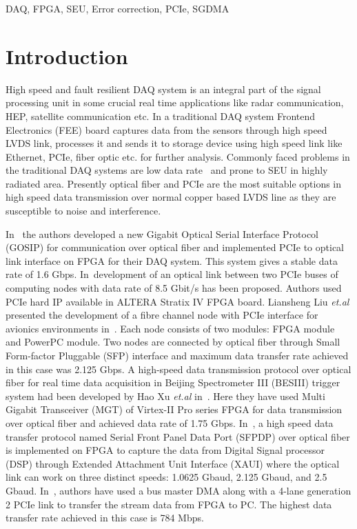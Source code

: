 \documentclass[10pt, conference, compsocconf]{IEEEtran}
\begin{document}
\begin{IEEEkeywords} 
DAQ, FPGA, SEU, Error correction, PCIe, SGDMA
\end{IEEEkeywords}
\section{Introduction}
\label{Introduction}
 High speed and fault resilient DAQ system is an integral part of the signal processing unit in some crucial real time applications like radar communication, HEP, satellite communication etc. In a traditional DAQ system Frontend Electronics (FEE) board captures data from the sensors through high speed LVDS link, processes it and sends it to storage device using high speed link like Ethernet, PCIe, fiber optic etc. for further analysis. Commonly faced problems in the traditional DAQ systems are low data rate~\cite{Wang:iciea:2009} and prone to SEU in highly radiated area. Presently optical fiber and PCIe are the most suitable options in high speed data transmission over normal copper based LVDS line as they are susceptible to noise and interference.
 \par 
 In~\cite{Minami:ieeetran:2011} the authors developed a new Gigabit Optical Serial Interface Protocol (GOSIP) for communication over optical fiber  and implemented PCIe to optical link interface on FPGA for their DAQ system. This system gives a stable data rate of 1.6 Gbps. In~\cite{kadric:socc:2012}\iffalse, we find the \fi  development of an optical link between two PCIe buses of computing nodes with data rate of 8.5 Gbit/s has been proposed. Authors used PCIe hard IP available in ALTERA Stratix IV FPGA board. Liansheng Liu \textit{ et.al} presented the development of a fibre channel node with PCIe interface for avionics environments in~\cite{Liu:i2mtc:2013:X}. Each node consists of two modules: FPGA module and PowerPC module. Two nodes are connected by optical fiber through Small Form-factor Pluggable (SFP) interface and maximum data transfer rate achieved in this case was 2.125 Gbps. A high-speed data transmission protocol over optical fiber for real time data acquisition in Beijing Spectrometer III (BESIII) trigger system had been developed by Hao Xu \textit{et.al} in~\cite{haoxu:nss:2007:XX}. Here they have used Multi Gigabit Transceiver (MGT) of Virtex-II Pro series FPGA for data transmission over optical fiber and achieved data rate of 1.75 Gbps. In~\cite {mattihalli:cecnet:2012}, a high speed data transfer protocol named Serial Front Panel Data Port (SFPDP) over optical fiber is implemented on FPGA to capture the data from Digital Signal processor (DSP) through Extended Attachment Unit Interface (XAUI) where the optical link can work on three distinct speeds: 1.0625 Gbaud, 2.125 Gbaud, and 2.5 Gbaud. In~\cite{bohm:nss:mic:2012}, authors have used a bus master DMA along with a 4-lane generation 2 PCIe link to transfer the stream data from FPGA to PC. The highest data transfer rate achieved in this case is 784 Mbps.
\end{document}
